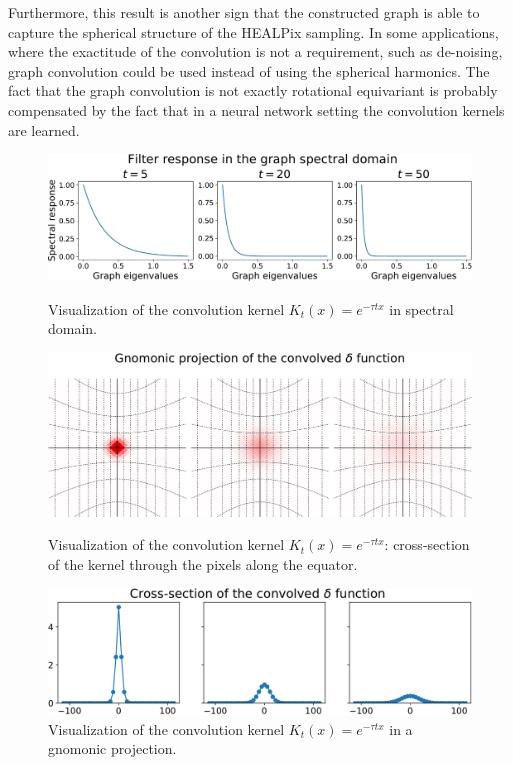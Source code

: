 \documentclass[final,twocolumn,3p,times,sort&compress]{elsarticle}
\newcommand{\todo}[1]{{\color[rgb]{.6,.1,.6}{#1}}}
\newcommand{\1}{\b{1}}              %
\newcommand{\0}{\b{0}}              %
\begin{document}
Furthermore, this result is another sign that the constructed graph is able to capture the spherical
structure of the HEALPix sampling. In some applications, where the
exactitude of the convolution is not a requirement, such as de-noising, graph convolution could be used instead of using the spherical harmonics.
The fact that the graph convolution is not exactly rotational equivariant is probably compensated by the fact that in a neural network setting the convolution kernels are learned.
\todo{not ideal tho as the graph convolution depends on the localization}


\begin{figure}
\centering
\includegraphics[width=\linewidth]{gaussian_filters_spectral}
\caption{Visualization of the convolution kernel $K_t(x)=e^{-\tau t x}$ in spectral domain.}
\vspace{0.3in}
\includegraphics[width=\linewidth]{gaussian_filters_gnomonic}
\caption{Visualization of the convolution kernel $K_t(x)=e^{-\tau t x}$: cross-section of the kernel through the pixels along the equator.}
\vspace{0.3in}
\includegraphics[width=\linewidth]{gaussian_filters_section}
\caption{Visualization of the convolution kernel $K_t(x)=e^{-\tau t x}$ in a gnomonic projection.}
\label{fig:gaussian_filters_visualization}
\end{figure}
\end{document}
